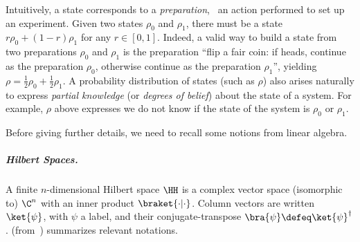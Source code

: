 \begin{example}
\label{ex:preparation}
Intuitively, a state corresponds to a \emph{preparation}, \ie\ an action performed to set up an experiment.
Given two states $\rho_0$ and $\rho_1$, there must be a state $r\rho_0 + (1-r)\rho_1$ for any $r\in[0,1]$.
Indeed, a valid way to build a state from two preparations $\rho_0$ and $\rho_1$ is the preparation ``flip a fair coin: if heads, continue as the preparation $\rho_0$, otherwise continue as the preparation $\rho_1$'', yielding $\rho = \tfrac12\rho_0 + \tfrac12\rho_1$.
A probability distribution of states (such as $\rho$) also arises naturally to express \emph{partial knowledge} (or \emph{degrees of belief}) about the state of a system.
For example, $\rho$ above expresses we do not know if the state of the system is $\rho_0$ or $\rho_1$.
\end{example}

Before giving further details, we need to recall some notions from linear algebra.

\subparagraph{Hilbert Spaces.}

A finite $n$-dimensional Hilbert space $\HH$ is a complex vector space (isomorphic to) $\C^n$ with an inner product $\braket{\cdot |\cdot}$.
Column vectors are written $\ket{\psi}$, with $\psi$ a label, and their conjugate-transpose $\bra{\psi} \defeq \ket{\psi}^\dagger$. 	
 (from~\cite{Nielsen_book}) summarizes relevant notations.


